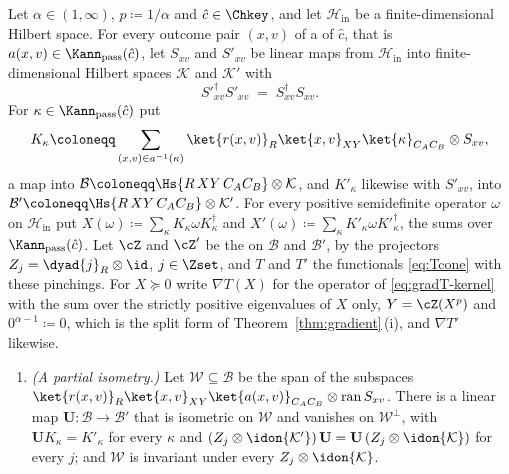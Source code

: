 \begin{lemma}\label{lem:kraus-freedom}
Let $\alpha\in(1,\infty)$, $p\coloneqq1/\alpha$ and $\hat c\in\Chkey$, and let
$\mathcal{H}_{\mathrm{in}}$ be a finite-dimensional Hilbert space. For every
outcome pair $(x,v)$ of a  of $\hat c$, that is
$a(x,v)\in\Kann_{\mathrm{pass}}(\hat c)$, let $S_{xv}$ and $S'_{xv}$ be linear
maps from $\mathcal{H}_{\mathrm{in}}$ into finite-dimensional Hilbert spaces
$\mathcal{K}$ and $\mathcal{K}'$ with
\begin{equation}\label{eq:kraus-gram}
  S'^{\dagger}_{xv}S'_{xv}\;=\;S^{\dagger}_{xv}S_{xv} .
\end{equation}
For $\kappa\in\Kann_{\mathrm{pass}}(\hat c)$ put
\begin{equation}\label{eq:kraus-factored}
  K_{\kappa}\coloneqq\sum_{(x,v)\in a^{-1}(\kappa)}\ket{r(x,v)}_R\ket{x,v}_{XY}
  \ket{\kappa}_{C_AC_B}\otimes S_{xv},
\end{equation}
a map into $\mathcal{B}\coloneqq\Hs{R\,XY\,C_AC_B}\otimes\mathcal{K}$, and
$K'_{\kappa}$ likewise with $S'_{xv}$, into
$\mathcal{B}'\coloneqq\Hs{R\,XY\,C_AC_B}\otimes\mathcal{K}'$. For every
positive semidefinite operator $\omega$ on $\mathcal{H}_{\mathrm{in}}$ put
$X(\omega)\coloneqq\sum_{\kappa}K_{\kappa}\omega K_{\kappa}^{\dagger}$ and
$X'(\omega)\coloneqq\sum_{\kappa}K'_{\kappa}\omega K'^{\dagger}_{\kappa}$,
the sums over $\Kann_{\mathrm{pass}}(\hat c)$. Let $\cZ$ and $\cZ'$ be the
 on $\mathcal{B}$ and $\mathcal{B}'$, by
the projectors $Z_j=\dyad{j}_R\otimes\id$, $j\in\Zset$, and $T$ and $T'$ the
functionals \eqref{eq:Tcone} with these pinchings. For $X\succeq0$ write
$\nabla T(X)$ for the operator of \eqref{eq:gradT-kernel} with the sum over
the strictly positive eigenvalues of $X$ only, $Y=\cZ(X^{p})$ and
$0^{\alpha-1}\coloneqq0$, which is the split form of
Theorem~\ref{thm:gradient}\,(i), and $\nabla T'$ likewise.
\begin{enumerate}[label=(\roman*),leftmargin=2.4em]
\item \emph{(A partial isometry.)} Let $\mathcal{W}\subseteq\mathcal{B}$ be
  the span of the subspaces
  $\ket{r(x,v)}_R\ket{x,v}_{XY}\ket{a(x,v)}_{C_AC_B}\otimes
  \operatorname{ran}S_{xv}$. There is a linear map
  $\mathbf U:\mathcal{B}\to\mathcal{B}'$ that is isometric on $\mathcal{W}$
  and vanishes on $\mathcal{W}^{\perp}$, with $\mathbf UK_{\kappa}=K'_{\kappa}$
  for every $\kappa$ and $(Z_j\otimes\idon{\mathcal{K}'})\,\mathbf U
  =\mathbf U\,(Z_j\otimes\idon{\mathcal{K}})$ for every $j$; and
  $\mathcal{W}$ is invariant under every $Z_j\otimes\idon{\mathcal{K}}$.

\end{enumerate}
\end{lemma}

